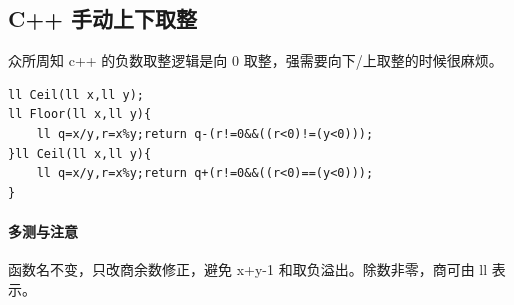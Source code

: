 \subsection{C++ 手动上下取整}
众所周知 c++ 的负数取整逻辑是向 0 取整，强需要向下/上取整的时候很麻烦。

\begin{lstlisting}
ll Ceil(ll x,ll y);
ll Floor(ll x,ll y){
    ll q=x/y,r=x%y;return q-(r!=0&&((r<0)!=(y<0)));
}ll Ceil(ll x,ll y){
    ll q=x/y,r=x%y;return q+(r!=0&&((r<0)==(y<0)));
}
\end{lstlisting}

\paragraph{多测与注意} 函数名不变，只改商余数修正，避免 x+y-1 和取负溢出。除数非零，商可由 ll 表示。
